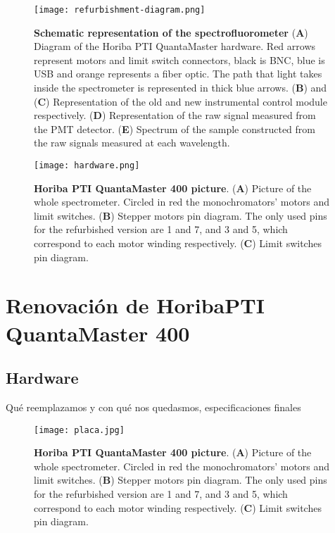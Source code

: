 \begin{figure}[btp]
     \centering
     \texttt{[image: refurbishment-diagram.png]}
     \caption{
    \textbf{Schematic representation of the spectrofluorometer}
    (\textbf{A}) Diagram of the Horiba PTI QuantaMaster hardware. Red arrows represent motors and limit switch connectors, black is BNC, blue is USB and orange represents a fiber optic. The path that light takes inside the spectrometer is represented in thick blue arrows. 
    (\textbf{B}) and (\textbf{C}) Representation of the old and new instrumental control module respectively.
    (\textbf{D}) Representation of the raw signal measured from the PMT detector.
    (\textbf{E}) Spectrum of the sample constructed from the raw signals measured at each wavelength.
    }
     \label{fig:ref-diagram}
\end{figure}

\begin{figure}[h]
     \centering
     \texttt{[image: hardware.png]}
     \caption{\textbf{Horiba PTI QuantaMaster 400 picture}.  (\textbf{A}) Picture of the whole spectrometer. Circled in red the monochromators' motors and limit switches. (\textbf{B}) Stepper motors pin diagram. The only used pins for the refurbished version are 1 and 7, and 3 and 5, which correspond to each motor winding respectively. (\textbf{C}) Limit switches pin diagram.}
     \label{fig:hardware}
\end{figure}


\section{Renovación de HoribaPTI QuantaMaster 400}
\subsection{Hardware }


Qué reemplazamos y con qué nos quedasmos, especificaciones finales

\begin{figure}[h]
     \centering
     \texttt{[image: placa.jpg]}
     \caption{\textbf{Horiba PTI QuantaMaster 400 picture}.  (\textbf{A}) Picture of the whole spectrometer. Circled in red the monochromators' motors and limit switches. (\textbf{B}) Stepper motors pin diagram. The only used pins for the refurbished version are 1 and 7, and 3 and 5, which correspond to each motor winding respectively. (\textbf{C}) Limit switches pin diagram.}
     \label{fig:placa}
\end{figure}

